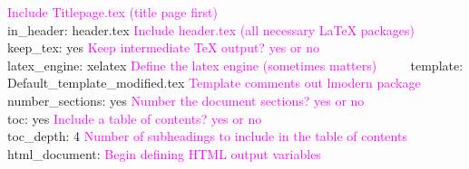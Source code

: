 \documentclass[12pt,]{article}
\begin{document}
\textcolor{magenta}{Include Titlepage.tex (title page first)}\\
\hspace*{0.333em}\hspace*{0.333em}\hspace*{0.333em}\hspace*{0.333em}\hspace*{0.333em}\hspace*{0.333em}\hspace*{0.333em}
in\_header: header.tex
\textcolor{magenta}{Include header.tex (all necessary LaTeX packages)}\\
\hspace*{0.333em}\hspace*{0.333em}\hspace*{0.333em}\hspace*{0.333em}
keep\_tex: yes
\textcolor{magenta}{Keep intermediate TeX output? yes or no}\\
\hspace*{0.333em}\hspace*{0.333em}\hspace*{0.333em}\hspace*{0.333em}
latex\_engine: xelatex
\textcolor{magenta}{Define the latex engine (sometimes matters)} ~~~~
template: Default\_template\_modified.tex
\textcolor{magenta}{Template comments out lmodern package} ~~~~
number\_sections: yes
\textcolor{magenta}{Number the document sections? yes or no}\\
\hspace*{0.333em}\hspace*{0.333em}\hspace*{0.333em}\hspace*{0.333em}
toc: yes \textcolor{magenta}{Include a table of contents? yes or no}\\
\hspace*{0.333em}\hspace*{0.333em}\hspace*{0.333em}\hspace*{0.333em}
toc\_depth: 4
\textcolor{magenta}{Number of subheadings to include in the table of contents}\\
\hspace*{0.333em}\hspace*{0.333em} html\_document:
\textcolor{magenta}{Begin defining HTML output variables}\\
\hspace*{0.333em}\hspace*{0.333em}\hspace*{0.333em}\hspace*{0.333em}
\end{document}
